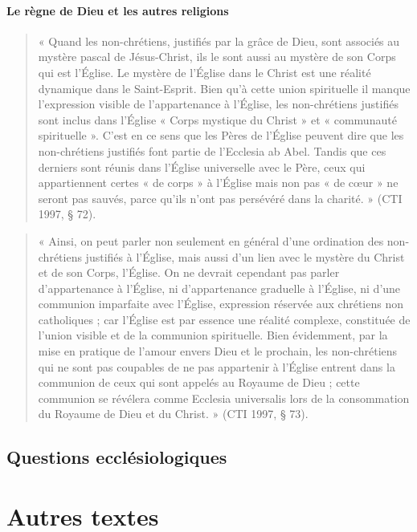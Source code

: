 \paragraph{Le règne de Dieu et les autres religions }

\begin{quote}
    « Quand les non-chrétiens, justifiés par la grâce de Dieu, sont associés au mystère pascal de Jésus-Christ, ils le sont aussi au mystère de son Corps qui est l’Église. Le mystère de l’Église dans le Christ est une réalité dynamique dans le Saint-Esprit. Bien qu’à cette union spirituelle il manque l’expression visible de l’appartenance à l’Église, les non-chrétiens justifiés sont inclus dans l’Église « Corps mystique du Christ » et « communauté spirituelle ». C’est en ce sens que les Pères de l’Église peuvent dire que les non-chrétiens justifiés font partie de l’Ecclesia ab Abel. Tandis que ces derniers sont réunis dans l’Église universelle avec le Père, ceux qui appartiennent certes « de corps » à l’Église mais non pas « de cœur » ne seront pas sauvés, parce qu’ils n’ont pas persévéré dans la charité. » (CTI 1997, § 72). 
\end{quote}

\begin{quote}
    « Ainsi, on peut parler non seulement en général d’une ordination des non-chrétiens justifiés à l’Église, mais aussi d’un lien avec le mystère du Christ et de son Corps, l’Église. On ne devrait cependant pas parler d’appartenance à l’Église, ni d’appartenance graduelle à l’Église, ni d’une communion imparfaite avec l’Église, expression réservée aux chrétiens non catholiques ; car l’Église est par essence une réalité complexe, constituée de l’union visible et de la communion spirituelle. Bien évidemment, par la mise en pratique de l’amour envers Dieu et le prochain, les non-chrétiens qui ne sont pas coupables de ne pas appartenir à l’Église entrent dans la communion de ceux qui sont appelés au Royaume de Dieu ; cette communion se révélera comme Ecclesia universalis lors de la consommation du Royaume de Dieu et du Christ. » (CTI 1997, § 73). 
\end{quote}
\subsection{Questions ecclésiologiques} 




\section{Autres textes}
